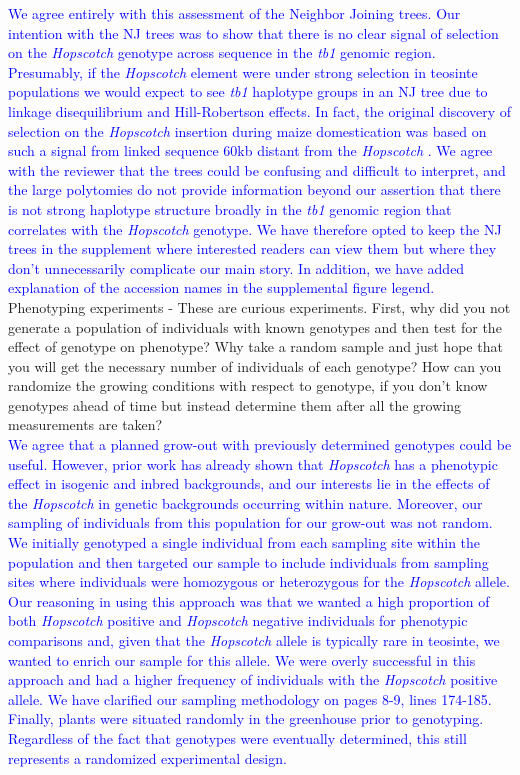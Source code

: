 \documentclass[11pt]{article}
\newcommand{\res}[1]{\noindent \textcolor{blue}{{#1}} \\}
\begin{document}
\res{We agree entirely with this assessment of the Neighbor Joining trees. 
Our intention with the NJ trees was to show that there is no clear signal of selection on the \emph{Hopscotch} genotype across sequence in the \emph{tb1} genomic region.
Presumably, if the \emph{Hopscotch} element were under strong selection in teosinte populations we would expect to see \emph{tb1} haplotype groups in an NJ tree due to linkage disequilibrium and Hill-Robertson effects.
In fact, the original discovery of selection on the \emph{Hopscotch} insertion during maize domestication was based on such a signal from linked sequence 60kb distant from the \emph{Hopscotch} \citep{Studer2011}. We agree with the reviewer that the trees could be confusing and difficult to interpret, and the large polytomies do not provide information beyond our assertion that there is not strong haplotype structure broadly in the \emph{tb1} genomic region that correlates with the \emph{Hopscotch} genotype.
We have therefore opted to keep the NJ trees in the supplement where interested readers can view them but where they don't unnecessarily complicate our main story.
In addition, we have added explanation of the accession names in the supplemental figure legend.}


Phenotyping experiments - These are curious experiments.  First, why did you not generate a population of individuals with known genotypes and then test for the effect of genotype on phenotype?  Why take a random sample and just hope that you will get the necessary number of individuals of each genotype?  How can you randomize the growing conditions with respect to genotype, if you don't know genotypes ahead of time but instead determine them after all the growing measurements are taken?\\

\res{We agree that a planned grow-out with previously determined genotypes could be useful.  
However, prior work has already shown that \emph{Hopscotch} has a phenotypic effect in isogenic and inbred backgrounds, \citep{Studer2011} and our interests lie in the effects of the \emph{Hopscotch} in genetic backgrounds occurring within nature.
Moreover, our sampling of individuals from this population for our grow-out was not random.  
We initially genotyped a single individual from each sampling site within the population and then targeted our sample to include individuals from sampling sites where individuals were homozygous or heterozygous for the \emph{Hopscotch} allele.
Our reasoning in using this approach was that we wanted a high proportion of both \emph{Hopscotch} positive and \emph{Hopscotch} negative individuals for phenotypic comparisons and, given that the \emph{Hopscotch} allele is typically rare in teosinte, we wanted to enrich our sample for this allele. 
We were overly successful in this approach and had a higher frequency of individuals with the \emph{Hopscotch} positive allele.
We have clarified our sampling methodology on pages 8-9, lines 174-185. Finally, plants were situated randomly in the greenhouse prior to genotyping.
Regardless of the fact that genotypes were eventually determined, this still represents a randomized experimental design.}
\end{document}
